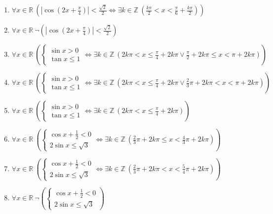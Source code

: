 \documentclass[11pt,a4paper]{article}
\begin{document}
\begin{enumerate}
\item $\displaystyle \forall x \in \mathbb{R}\ \left( \left|\cos\left(2x + \frac{\pi}{4}\right)\right| < \frac{\sqrt{2}}{2} \iff \exists k \in \mathbb{Z}\ \left( \frac{k\pi}{2} < x < \frac{\pi}{6} + \frac{k\pi}{2} \right) \right)$
\item $\displaystyle \forall x \in \mathbb{R}\ \lnot \left( \left|\cos\left(2x + \frac{\pi}{4}\right)\right| < \frac{\sqrt{2}}{2} \right)$
\item $\displaystyle \forall x \in \mathbb{R}\ \left( \begin{cases} \sin x > 0 \\ \tan x \le 1 \end{cases} \iff \exists k \in \mathbb{Z}\ \left( 2k\pi < x \le \frac{\pi}{4} + 2k\pi \lor \frac{\pi}{2} + 2k\pi \le x < \pi + 2k\pi \right) \right)$
\item $\displaystyle \forall x \in \mathbb{R}\ \left( \begin{cases} \sin x > 0 \\ \tan x \le 1 \end{cases} \iff \exists k \in \mathbb{Z}\ \left( 2k\pi < x \le \frac{\pi}{4} + 2k\pi \lor \frac{2}{3}\pi + 2k\pi < x < \pi + 2k\pi \right) \right)$
\item $\displaystyle \forall x \in \mathbb{R}\ \left( \begin{cases} \sin x > 0 \\ \tan x \le 1 \end{cases} \iff \exists k \in \mathbb{Z}\ \left( 2k\pi < x \le \frac{\pi}{4} + 2k\pi \right) \right)$
\item $\displaystyle \forall x \in \mathbb{R}\ \left( \begin{cases} \cos x + \frac{1}{2} < 0 \\ 2\sin x \le \sqrt{3} \end{cases} \iff \exists k \in \mathbb{Z}\ \left( \frac{2}{3}\pi + 2k\pi \le x < \frac{4}{3}\pi + 2k\pi \right) \right)$
\item $\displaystyle \forall x \in \mathbb{R}\ \left( \begin{cases} \cos x + \frac{1}{2} < 0 \\ 2\sin x \le \sqrt{3} \end{cases} \iff \exists k \in \mathbb{Z}\ \left( \frac{2}{3}\pi + 2k\pi < x < \frac{5}{4}\pi + 2k\pi \right) \right)$
\item $\displaystyle \forall x \in \mathbb{R}\ \lnot \left( \begin{cases} \cos x + \frac{1}{2} < 0 \\ 2\sin x \le \sqrt{3} \end{cases} \right)$

\end{enumerate}
\end{document}
